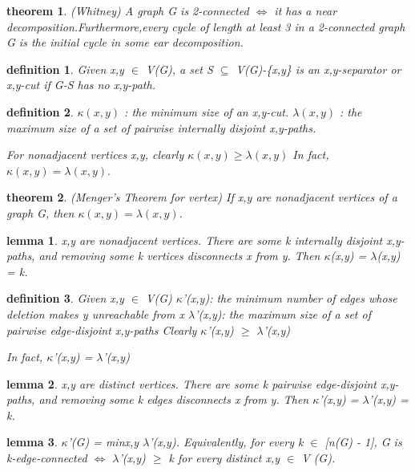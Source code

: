 \documentclass[twocolumn]{article}
\newtheorem{theorem}{theorem}[section]  %
\newtheorem{definition}{definition}
\newtheorem{lemma}{lemma}
\begin{document}
\begin{CJK*}{UTF8}{bkai}
    \begin{theorem}{(Whitney)}
        A graph G is 2-connected $\iff$ it has a near decomposition.Furthermore,every
 cycle of length at least 3 in a 2-connected graph G is the initial cycle in some
 ear decomposition.
    \end{theorem}

    \begin{definition}
         Given x,y $\in$ V(G), a set S $\subseteq $ V(G)-\{x,y\} is an x,y-separator or x,y-cut if
 G-S has no x,y-path.
    \end{definition}

    \begin{definition}
        $\kappa (x , y)$ : the minimum size of an x,y-cut.
        $\lambda (x , y)$ :  the maximum size of a set of pairwise internally disjoint x,y-paths.

        For nonadjacent vertices x,y, clearly $\kappa(x,y) \geq \lambda (x,y)$
 In fact, $\kappa(x,y) = \lambda(x,y).$
    \end{definition}

    \begin{theorem}{(Menger's Theorem for vertex)}
         If x,y are nonadjacent vertices of a graph G, then $\kappa(x,y) = \lambda(x,y)$.
    \end{theorem}

    \begin{lemma}
         x,y are nonadjacent vertices. There are some k internally disjoint x,y-paths,
 and removing some k vertices disconnects x from y. Then
 $\kappa$(x,y) = $\lambda$(x,y) = k.
    \end{lemma}

    \begin{definition}
        Given x,y $\in$ V(G)
 $\kappa$'(x,y): the minimum number of edges whose deletion makes y unreachable
 from x
 $\lambda$'(x,y): the maximum size of a set of pairwise edge-disjoint x,y-paths
 Clearly $\kappa$'(x,y) $\geq$ $\lambda$'(x,y)

  In fact, $\kappa$'(x,y) = $\lambda$'(x,y)
    \end{definition}

    \begin{lemma}
        x,y are distinct vertices. There are some k pairwise edge-disjoint x,y-paths,
 and removing some k edges disconnects x from y. Then $\kappa$'(x,y) = $\lambda$'(x,y) = k.
    \end{lemma}

    \begin{lemma}
         $\kappa$'(G) = minx,y $\lambda$'(x,y). Equivalently, for every k $\in$ [n(G) - 1], G is
 k-edge-connected $\iff$ $\lambda$'(x,y) $\geq$ k for every distinct x,y $\in$ V (G).
    \end{lemma}


\end{CJK*}
\end{document}
